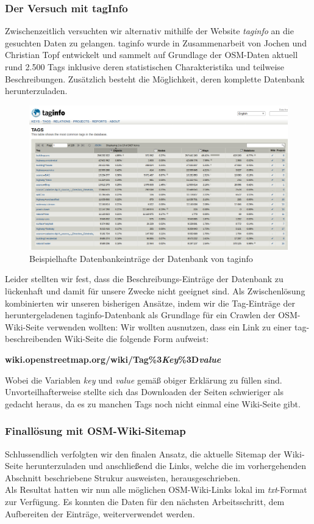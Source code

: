 \documentclass[12pt,pdftex,a4paper]{article}
\begin{document}
\subsubsection{Der Versuch mit tagInfo}\label{sec:tagInfo}
Zwischenzeitlich versuchten wir alternativ mithilfe der Website \textit{taginfo} \cite{taginfoWebsite} an die gesuchten Daten zu gelangen. taginfo wurde in Zusammenarbeit von Jochen und Christian Topf entwickelt und sammelt auf Grundlage der OSM-Daten aktuell rund 2.500 Tags inklusive deren statistischen Charakteristika und teilweise Beschreibungen\cite{taginfoAbout}. Zusätzlich besteht die Möglichkeit, deren komplette Datenbank herunterzuladen.\\
\begin{figure}[h]
	\centering
	\includegraphics[width=0.9\linewidth]{Bilder/taginfo_example}
	\caption[Beispielhafte Darstellung taginfo]{Beispielhafte Datenbankeinträge der Datenbank von taginfo}
	\label{fig:taginfoexample}
\end{figure}
Leider stellten wir fest, dass die Beschreibungs-Einträge der Datenbank zu lückenhaft und damit für unsere Zwecke nicht geeignet sind.
Als Zwischenlösung kombinierten wir unseren bisherigen Ansätze, indem wir die Tag-Einträge der heruntergeladenen taginfo-Datenbank als Grundlage für ein Crawlen der OSM-Wiki-Seite verwenden wollten: Wir wollten ausnutzen, dass ein Link zu einer tag-beschreibenden Wiki-Seite die folgende Form aufweist:
\begin{center}
	\textbf{wiki.openstreetmap.org/wiki/Tag\%3\textit{Key}\%3D\textit{value}}
\end{center}
Wobei die Variablen \textit{key} und \textit{value} gemäß obiger Erklärung zu füllen sind. Unvorteilhafterweise stellte sich das Downloaden der Seiten schwieriger als gedacht heraus, da es zu manchen Tags noch nicht einmal eine Wiki-Seite gibt.

\subsubsection{Finallösung mit OSM-Wiki-Sitemap}
Schlussendlich verfolgten wir den finalen Ansatz, die aktuelle Sitemap der Wiki-Seite\cite{sitemap-index-wiki-link} herunterzuladen und anschließend die Links, welche die im vorhergehenden Abschnitt beschriebene Strukur ausweisten, herausgeschrieben.\\
Als Resultat hatten wir nun alle möglichen OSM-Wiki-Links lokal im \textit{txt}-Format zur Verfügung. Es konnten die Daten für den nächsten Arbeitsschritt, dem Aufbereiten der Einträge, weiterverwendet werden.
\end{document}
